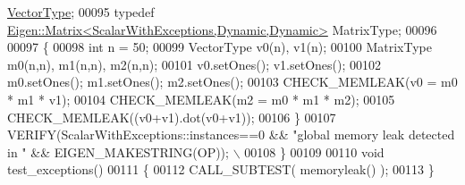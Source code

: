 \begin{DoxyCode}
      \hyperlink{struct_vector_type}{VectorType};
00095   \textcolor{keyword}{typedef} \hyperlink{group___core___module_class_eigen_1_1_matrix}{Eigen::Matrix<ScalarWithExceptions,Dynamic,Dynamic>}
       MatrixType;
00096   
00097   \{
00098     \textcolor{keywordtype}{int} n = 50;
00099     VectorType v0(n), v1(n);
00100     MatrixType m0(n,n), m1(n,n), m2(n,n);
00101     v0.setOnes(); v1.setOnes();
00102     m0.setOnes(); m1.setOnes(); m2.setOnes();
00103     CHECK\_MEMLEAK(v0 = m0 * m1 * v1);
00104     CHECK\_MEMLEAK(m2 = m0 * m1 * m2);
00105     CHECK\_MEMLEAK((v0+v1).dot(v0+v1));
00106   \}
00107   VERIFY(ScalarWithExceptions::instances==0 && \textcolor{stringliteral}{"global memory leak detected in "} && EIGEN\_MAKESTRING(OP)); 
      \(\backslash\)
00108 \}
00109 
00110 \textcolor{keywordtype}{void} test\_exceptions()
00111 \{
00112   CALL\_SUBTEST( memoryleak() );
00113 \}
\end{DoxyCode}
